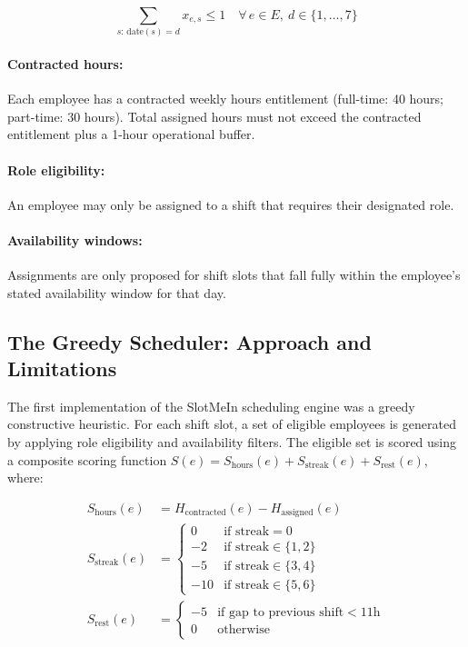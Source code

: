 \documentclass[12pt,a4paper,oneside]{article}
\begin{document}
\begin{equation}
\sum_{s:\, \text{date}(s) = d} x_{e,s} \leq 1 \quad \forall\, e \in E,\ d \in \{1, \ldots, 7\}
\label{eq:daily}
\end{equation}

\paragraph{Contracted hours:} Each employee has a contracted weekly hours entitlement (full-time: 40 hours; part-time: 30 hours). Total assigned hours must not exceed the contracted entitlement plus a 1-hour operational buffer.

\paragraph{Role eligibility:} An employee may only be assigned to a shift that requires their designated role.

\paragraph{Availability windows:} Assignments are only proposed for shift slots that fall fully within the employee's stated availability window for that day.

\subsection{The Greedy Scheduler: Approach and Limitations}

The first implementation of the SlotMeIn scheduling engine was a greedy constructive heuristic. For each shift slot, a set of eligible employees is generated by applying role eligibility and availability filters. The eligible set is scored using a composite scoring function $S(e) = S_{\text{hours}}(e) + S_{\text{streak}}(e) + S_{\text{rest}}(e)$, where:

\begin{align}
S_{\text{hours}}(e) &= H_{\text{contracted}}(e) - H_{\text{assigned}}(e) \label{eq:score_hours} \\
S_{\text{streak}}(e) &= \begin{cases} 0 & \text{if streak} = 0 \\ -2 & \text{if streak} \in \{1,2\} \\ -5 & \text{if streak} \in \{3,4\} \\ -10 & \text{if streak} \in \{5,6\} \end{cases} \label{eq:score_streak} \\
S_{\text{rest}}(e) &= \begin{cases} -5 & \text{if gap to previous shift} < 11\text{h} \\ 0 & \text{otherwise} \end{cases} \label{eq:score_rest}
\end{align}
\end{document}

